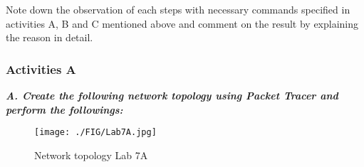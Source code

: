 \documentclass[a4paper,11pt]{article}
\begin{document}
\pagebreak
\begin{Q}
    {
        Note down the observation of each steps with necessary commands specified in activities
        A, B and C mentioned above and comment on the result by explaining the reason in detail.
    }
\end{Q}

%
%
%
%


%
%
%



\subsubsection{Activities A}

{\bfseries \textit{A. Create the following network topology using Packet Tracer and perform the followings:}}

\begin{figure}[H]
    \centering
    \texttt{[image: ./FIG/Lab7A.jpg]}
    \caption{Network topology Lab 7A}
\end{figure}
\end{document}
